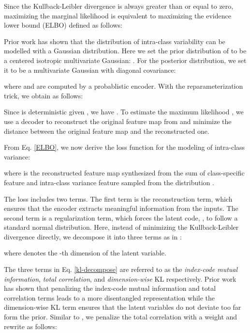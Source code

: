 \documentclass[10pt,twocolumn,letterpaper]{article}
\begin{document}
      
      
      
      Since the Kullback-Leibler divergence is always greater than or equal to zero, maximizing the marginal likelihood  is equivalent to maximizing the evidence lower bound (ELBO) defined as follows:
\small
      
      \normalsize
Prior work \cite{metric_learning,feature_transfer,variational_fewshot} has shown that the distribution of intra-class variability can be modelled with a Gaussian distribution.
Here we set the prior distribution of  to be a centered isotropic multivariate Gaussian: .
For the posterior distribution, we set it to be a multivariate Gaussian with diagonal covariance:
      
      \noindent where  and  are computed by a probablistic encoder.
With the reparameterization trick, we obtain  as follows:
       
  
Since  is deterministic given , we have .
      To estimate the maximum likelihood , we use a decoder to reconstruct
      the original feature map from  and minimize the  distance between
      the original feature map and the reconstructed one.
      
      From Eq. \ref{ELBO}, we now derive the loss function for the modeling of intra-class variance:
      \small
      
\normalsize
      where  is the reconstructed feature map synthesized from the sum of class-specific feature 
      and intra-class variance feature  sampled from the distribution .      
      
      The  loss includes two terms.
The first term is the reconstruction term, which ensures that the encoder extracts meaningful information from the inputs.
The second term is a regularization term, which forces the latent code, , to follow a standard normal distribution.
Here, instead of minimizing the Kullback-Leibler divergence directly, we decompose it into three terms as in \cite{beta-tv-vae}:
      
      \footnotesize
      
      
      \normalsize
      \noindent where  denotes the -th dimension of the latent variable.
      
      The three terms in Eq. \ref{kl-decompose} are referred to as the \textit{index-code mutual information}, \textit{total correlation}, and \textit{dimension-wise} KL respectively.
Prior work \cite{beta-tv-vae,Achille2018,Burgess2018UnderstandingDI} has shown that penalizing the index-code mutual information and total correlation terms leads to a more disentangled representation while the dimension-wise KL term ensures that the latent variables do not deviate too far form the prior. Similar to \cite{beta-tv-vae}, we penalize the total correlation with a weight 
      and rewrite   as follows:
      
\end{document}
